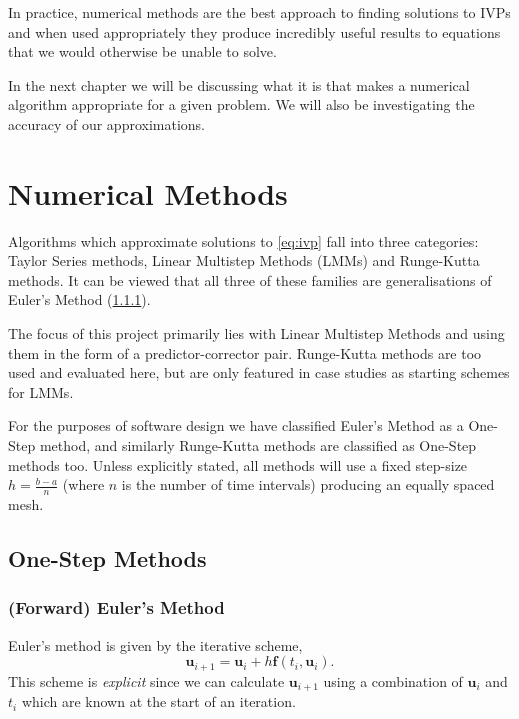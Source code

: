 \documentclass[12pt, twoside]{report}
\theoremstyle{plain}
\theoremstyle{definition}
\theoremstyle{definition}
\begin{document}
        In practice, numerical methods are the best approach to finding 
        solutions to IVPs and when used appropriately they produce incredibly 
        useful results to equations that we would otherwise be unable to solve.

        In the next chapter we will be discussing what it is that makes a 
        numerical algorithm appropriate for a given problem. We will also be
        investigating the accuracy of our approximations.



\chapter{Numerical Methods}

    Algorithms which approximate solutions to \eqref{eq:ivp} fall into three
    categories: Taylor Series methods, Linear Multistep Methods (LMMs) and 
    Runge-Kutta methods. It can be viewed that all three of these families are
    generalisations of Euler's Method (\ref{2_forward_euler}). 

    The focus of this project primarily lies with Linear Multistep Methods and 
    using them in the form of a predictor-corrector pair. Runge-Kutta methods
    are too used and evaluated here, but are only featured in case studies
    as starting schemes for LMMs.

    For the purposes of software design we have classified Euler's Method as a
    One-Step method, and similarly Runge-Kutta methods are classified as 
    One-Step methods too. Unless explicitly stated, all methods will use a 
    fixed step-size $h=\frac{b-a}{n}$ (where $n$ is the number of time 
    intervals) producing an equally spaced mesh.

    \section{One-Step Methods}
    \label{2_onestep}
        
        \subsection{(Forward) Euler's Method}
        \label{2_forward_euler}
            Euler's method is given by the iterative scheme,
            \begin{equation}
            \label{eq:euler}
                \mathbf{u}_{i+1} = \mathbf{u}_i + h\mathbf{f}(t_i, 
                \mathbf{u}_i).
            \end{equation}
            This scheme is \textit{explicit} since we can calculate 
            $\mathbf{u}_{i+1}$ using a combination of $\mathbf{u}_i$ and $t_i$
            which are known at the start of an iteration.
\end{document}
